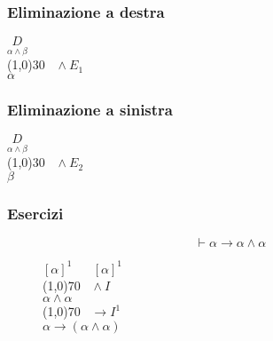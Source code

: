 \documentclass{article}
\theoremstyle{break}
\theoremstyle{break}
\theoremstyle{break}
\theoremstyle{break}
\begin{document}
\subsubsection{Eliminazione a destra}
\begin{center}
        \(
            \underset{\alpha \wedge \beta}{D}
        \)\\ 
            \hspace{1cm}\line(1,0){30}\(\;\;\; \wedge E_1 \)\\  
        \(
            \alpha
        \)
\end{center}

\subsubsection{Eliminazione a sinistra}
\begin{center}
        \(
            \underset{\alpha \wedge \beta}{D}
        \)\\ 
            \hspace{1cm}\line(1,0){30}\(\;\;\; \wedge E_2 \)\\  
        \(
            \beta
        \)
\end{center}

\subsubsection{Esercizi}

\begin{figure}[H]
    \begin{exercise}
        \[
            \vdash \alpha \to \alpha \wedge \alpha
        \] 
        \begin{center}
            \(
            [\alpha]^1 \;\;\;\;\;\; [\alpha]^1
            \)\\ 
            \hspace{0.8cm}\line(1,0){70}\(\;\;\; \wedge I \)\\
            \(
            \alpha \wedge \alpha
            \)\\
            \hspace{1.2cm}\line(1,0){70}\(\;\;\; \to I^1 \)\\
            \( \alpha \to (\alpha \wedge \alpha) \) 
        \end{center}
    \end{exercise}
\end{figure}
\end{document}
